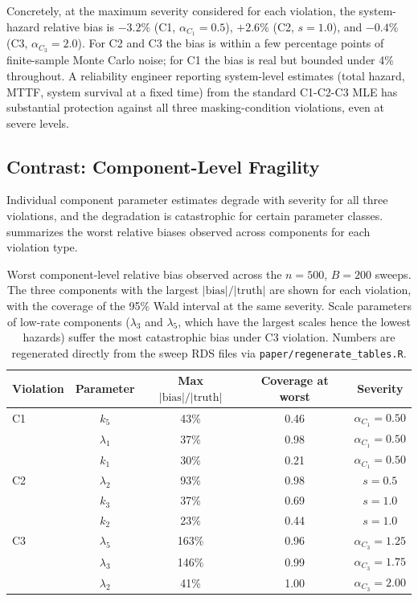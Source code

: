 Concretely, at the maximum severity considered for each violation, the
system-hazard relative bias is $-3.2\%$ (C1, $\alpha_{C_1} = 0.5$),
$+2.6\%$ (C2, $s = 1.0$), and $-0.4\%$ (C3, $\alpha_{C_3} = 2.0$). For C2
and C3 the bias is within a few percentage points of finite-sample Monte
Carlo noise; for C1 the bias is real but bounded under 4\% throughout. A
reliability engineer reporting system-level estimates (total hazard, MTTF,
system survival at a fixed time) from the standard C1-C2-C3 MLE has
substantial protection against all three masking-condition violations,
even at severe levels.

\subsection{Contrast: Component-Level Fragility}
\label{sec:sim-fragility}

Individual component parameter estimates degrade with severity for all
three violations, and the degradation is catastrophic for certain
parameter classes.  summarizes the worst
relative biases observed across components for each violation type.

\begin{table}[htbp]
\centering
\caption{Worst component-level relative bias observed across the
$n = 500$, $B = 200$ sweeps. The three components with the largest
$|\text{bias}|/|\text{truth}|$ are shown for each violation, with the
coverage of the 95\% Wald interval at the same severity. Scale parameters
of low-rate components ($\lambda_3$ and $\lambda_5$, which have the
largest scales hence the lowest hazards) suffer the most catastrophic
bias under C3 violation. Numbers are regenerated directly from the sweep
RDS files via \texttt{paper/regenerate\_tables.R}.}
\label{tab:component-fragility}
\small
\begin{tabular}{lcccc}
\toprule
Violation & Parameter & Max $|\text{bias}|/|\text{truth}|$ & Coverage at worst & Severity \\
\midrule
C1 & $k_5$        & 43\%   & 0.46          & $\alpha_{C_1} = 0.50$ \\
   & $\lambda_1$  & 37\%   & 0.98          & $\alpha_{C_1} = 0.50$ \\
   & $k_1$        & 30\%   & 0.21          & $\alpha_{C_1} = 0.50$ \\
\midrule
C2 & $\lambda_2$  & 93\%   & 0.98          & $s = 0.5$ \\
   & $k_3$        & 37\%   & 0.69          & $s = 1.0$ \\
   & $k_2$        & 23\%   & 0.44          & $s = 1.0$ \\
\midrule
C3 & $\lambda_5$  & 163\%  & 0.96          & $\alpha_{C_3} = 1.25$ \\
   & $\lambda_3$  & 146\%  & 0.99          & $\alpha_{C_3} = 1.75$ \\
   & $\lambda_2$  & 41\%   & 1.00          & $\alpha_{C_3} = 2.00$ \\
\bottomrule
\end{tabular}
\end{table}

